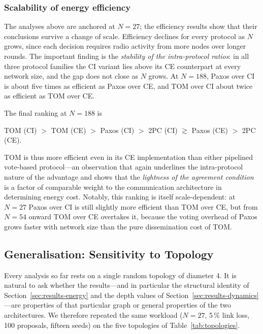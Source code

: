\documentclass[journal]{IEEEtran}
\newcommand{\CI}{CI}                      %
\newcommand{\CE}{CE}                      %
\newcommand{\Nnodes}{N}                   %
\begin{document}
\subsubsection{Scalability of energy efficiency}


The analyses above are anchored at $\Nnodes = 27$; the efficiency results
show that their conclusions survive a change of scale. Efficiency declines
for every protocol as $\Nnodes$ grows, since each decision requires radio
activity from more nodes over longer rounds. The important finding is the
\emph{stability of the intra-protocol ratios}: in all three protocol
families the \CI{} variant lies above its \CE{} counterpart at every
network size, and the gap does not close as $\Nnodes$ grows. At
$\Nnodes = 188$, Paxos over \CI{} is about five times as efficient as
Paxos over \CE, and TOM over \CI{} about twice as efficient as TOM over
\CE.

The final ranking at $\Nnodes = 188$ is

\begin{center}
TOM (\CI) $>$ TOM (\CE) $>$ Paxos (\CI) $>$ 2PC (\CI) $\gtrsim$
Paxos (\CE) $>$ 2PC (\CE).
\end{center}

TOM is thus more efficient even in its \CE{} implementation than either
pipelined vote-based protocol---an observation that again underlines the
intra-protocol nature of the advantage and shows that the
\emph{lightness of the agreement condition} is a factor of comparable
weight to the communication architecture in determining energy cost.
Notably, this ranking is itself scale-dependent: at $\Nnodes = 27$ Paxos
over \CI{} is still slightly more efficient than TOM over \CE, but from
$\Nnodes = 54$ onward TOM over \CE{} overtakes it, because the voting
overhead of Paxos grows faster with network size than the pure
dissemination cost of TOM.

\subsection{Generalisation: Sensitivity to Topology}
\label{sec:results-topology}
Every analysis so far rests on a single random topology of diameter 4. It
is natural to ask whether the results---and in particular the structural
identity of Section~\ref{sec:results-energy} and the depth values of
Section~\ref{sec:results-dynamics}---are properties of that particular
graph or general properties of the two architectures. We therefore
repeated the same workload ($\Nnodes = 27$, 5\,\% link loss, 100
proposals, fifteen seeds) on the five topologies of
Table~\ref{tab:topologies}.
\end{document}
